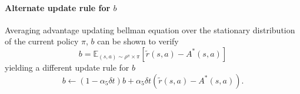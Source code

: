 \documentclass[11pt]{article}
\newcommand{\deltat}{{\delta t}}
\newcommand{\E}{\mathbb{E}}
\begin{document}
\paragraph{Alternate update rule for $b$}
Averaging advantage updating bellman equation over the stationary distribution of the current policy $\pi$, $b$ can be shown to verify
\begin{equation}
	b = \E_{(s, a) \sim \rho^\pi \times \pi}\left[\tilde{r}(s, a) - A^*(s, a)\right]
\end{equation}
yielding a different update rule for $b$
\begin{equation}
	b \leftarrow (1 - \alpha_5 \deltat) b + \alpha_5 \deltat \left(\tilde{r}(s, a) - A^*(s, a)\right).
\end{equation}
\end{document}
